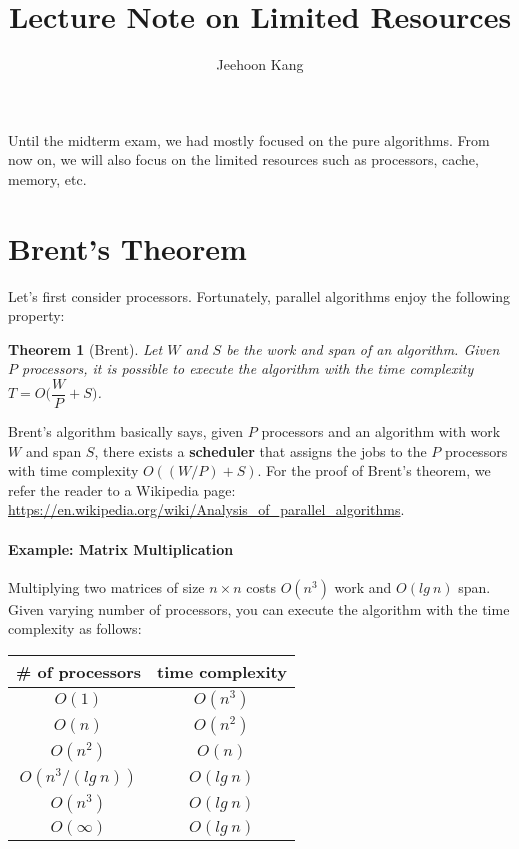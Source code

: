 \documentclass[11pt,a4paper,oneside,microtype,nokorean]{oblivoir}
\newtheorem{theorem}{Theorem}
\begin{document}
\title{Lecture Note on Limited Resources}
\author{Jeehoon Kang}
\maketitle

Until the midterm exam, we had mostly focused on the pure algorithms.  From now on, we will also
focus on the limited resources such as processors, cache, memory, etc.


\section{Brent's Theorem}

Let's first consider processors.  Fortunately, parallel algorithms enjoy the following property:

\begin{theorem}[Brent]
  Let $W$ and $S$ be the work and span of an algorithm.  Given $P$ processors, it is possible to
  execute the algorithm with the time complexity $T = O \Big( \dfrac{W}{P} + S \Big)$.
\end{theorem}

Brent's algorithm basically says, given $P$ processors and an algorithm with work $W$ and span $S$,
there exists a \textbf{scheduler} that assigns the jobs to the $P$ processors with time complexity
$O((W/P) + S)$.  For the proof of Brent's theorem, we refer the reader to a Wikipedia page:
\url{https://en.wikipedia.org/wiki/Analysis_of_parallel_algorithms}.


\paragraph{Example: Matrix Multiplication}

Multiplying two matrices of size $n \times n$ costs $O(n^3)$ work and $O(lg~n)$ span.  Given varying
number of processors, you can execute the algorithm with the time complexity as follows:

\begin{center}
\begin{tabular}{ c | c }
 \# of processors & time complexity \\
  \hline
 $O(1)$ & $O(n^3)$ \\
 $O(n)$ & $O(n^2)$ \\
 $O(n^2)$ & $O(n)$ \\
 $O(n^3 / (lg~n))$ & $O(lg~n)$ \\
 $O(n^3)$ & $O(lg~n)$ \\
 $O(\infty)$ & $O(lg~n)$
\end{tabular}
\end{center}
\end{document}
